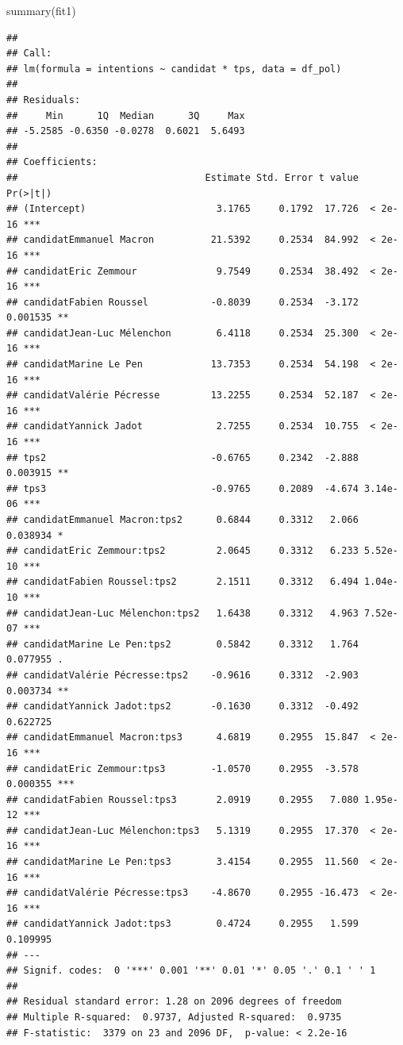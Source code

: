 \documentclass[
]{book}
\newenvironment{Shaded}{\begin{snugshade}}{\end{snugshade}}
\newcommand{\FunctionTok}[1]{\textcolor[rgb]{0.00,0.00,0.00}{#1}}
\newcommand{\NormalTok}[1]{#1}
\begin{document}
\begin{Shaded}
\begin{Highlighting}[]
\FunctionTok{summary}\NormalTok{(fit1)}
\end{Highlighting}
\end{Shaded}

\begin{verbatim}
## 
## Call:
## lm(formula = intentions ~ candidat * tps, data = df_pol)
## 
## Residuals:
##     Min      1Q  Median      3Q     Max 
## -5.2585 -0.6350 -0.0278  0.6021  5.6493 
## 
## Coefficients:
##                                 Estimate Std. Error t value Pr(>|t|)    
## (Intercept)                       3.1765     0.1792  17.726  < 2e-16 ***
## candidatEmmanuel Macron          21.5392     0.2534  84.992  < 2e-16 ***
## candidatEric Zemmour              9.7549     0.2534  38.492  < 2e-16 ***
## candidatFabien Roussel           -0.8039     0.2534  -3.172 0.001535 ** 
## candidatJean-Luc Mélenchon        6.4118     0.2534  25.300  < 2e-16 ***
## candidatMarine Le Pen            13.7353     0.2534  54.198  < 2e-16 ***
## candidatValérie Pécresse         13.2255     0.2534  52.187  < 2e-16 ***
## candidatYannick Jadot             2.7255     0.2534  10.755  < 2e-16 ***
## tps2                             -0.6765     0.2342  -2.888 0.003915 ** 
## tps3                             -0.9765     0.2089  -4.674 3.14e-06 ***
## candidatEmmanuel Macron:tps2      0.6844     0.3312   2.066 0.038934 *  
## candidatEric Zemmour:tps2         2.0645     0.3312   6.233 5.52e-10 ***
## candidatFabien Roussel:tps2       2.1511     0.3312   6.494 1.04e-10 ***
## candidatJean-Luc Mélenchon:tps2   1.6438     0.3312   4.963 7.52e-07 ***
## candidatMarine Le Pen:tps2        0.5842     0.3312   1.764 0.077955 .  
## candidatValérie Pécresse:tps2    -0.9616     0.3312  -2.903 0.003734 ** 
## candidatYannick Jadot:tps2       -0.1630     0.3312  -0.492 0.622725    
## candidatEmmanuel Macron:tps3      4.6819     0.2955  15.847  < 2e-16 ***
## candidatEric Zemmour:tps3        -1.0570     0.2955  -3.578 0.000355 ***
## candidatFabien Roussel:tps3       2.0919     0.2955   7.080 1.95e-12 ***
## candidatJean-Luc Mélenchon:tps3   5.1319     0.2955  17.370  < 2e-16 ***
## candidatMarine Le Pen:tps3        3.4154     0.2955  11.560  < 2e-16 ***
## candidatValérie Pécresse:tps3    -4.8670     0.2955 -16.473  < 2e-16 ***
## candidatYannick Jadot:tps3        0.4724     0.2955   1.599 0.109995    
## ---
## Signif. codes:  0 '***' 0.001 '**' 0.01 '*' 0.05 '.' 0.1 ' ' 1
## 
## Residual standard error: 1.28 on 2096 degrees of freedom
## Multiple R-squared:  0.9737, Adjusted R-squared:  0.9735 
## F-statistic:  3379 on 23 and 2096 DF,  p-value: < 2.2e-16
\end{verbatim}
\end{document}
